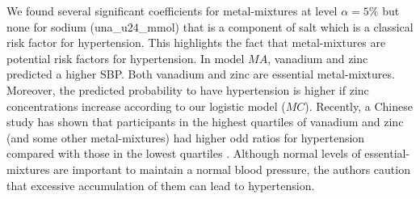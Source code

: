 We found several significant coefficients for metal-mixtures at level $\alpha=5\%$ but none for sodium (una\_u24\_mmol) that is a component of salt which is a classical risk factor for hypertension. This highlights the fact that metal-mixtures are potential risk factors for hypertension. In model $MA$, vanadium and zinc predicted a higher SBP. Both vanadium and zinc are essential metal-mixtures. Moreover, the predicted probability to have hypertension is higher if zinc concentrations increase according to our logistic model ($MC$).  Recently, a Chinese study has shown that participants in the highest quartiles of vanadium and zinc (and some other metal-mixtures) had higher odd ratios for hypertension compared with those in the lowest quartiles \cite{wu_environmental_2018}. Although normal levels of essential-mixtures are important to maintain a normal blood pressure, the authors caution that excessive accumulation of them can lead to hypertension.



